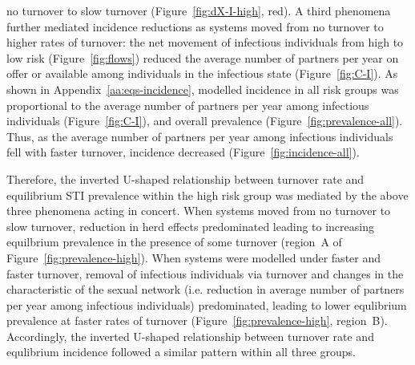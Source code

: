 no turnover to slow turnover (Figure~\ref{fig:dX-I-high}, red).
A third phenomena further mediated incidence reductions as systems
moved from no turnover to higher rates of turnover: 
the net movement of infectious individuals
from high to low risk (Figure~\ref{fig:flows}) reduced
the average number of partners per year on offer or available among 
individuals in the infectious state
(Figure~\ref{fig:C-I}). 
As shown in Appendix~\ref{aa:eqs-incidence},
modelled incidence in all risk groups was proportional to
the average number of partners per year among infectious individuals
(Figure~\ref{fig:C-I}),
and overall prevalence
(Figure~\ref{fig:prevalence-all}).
Thus, as the average number of partners per year among infectious individuals
fell with faster turnover, incidence decreased
(Figure~\ref{fig:incidence-all}).


\par
Therefore, the inverted U-shaped relationship between turnover rate
and equilibrium STI prevalence within the high risk group was mediated
by the above three phenomena acting in concert. When systems moved 
from no turnover to 
slow turnover, reduction in herd effects predominated leading to increasing
equilbrium prevalence in the presence of some turnover 
(region~A of Figure~\ref{fig:prevalence-high}).
When systems were modelled under faster and faster turnover,
removal of infectious individuals via turnover and changes in the characteristic of the 
sexual network (i.e. reduction in average number of partners per year among infectious individuals) 
predominated, leading to lower equlibrium prevalence
at faster rates of turnover (Figure~\ref{fig:prevalence-high}, region~B).
Accordingly, the inverted U-shaped relationship between turnover rate and equlibrium incidence 
followed a similar pattern within all three groups. 


